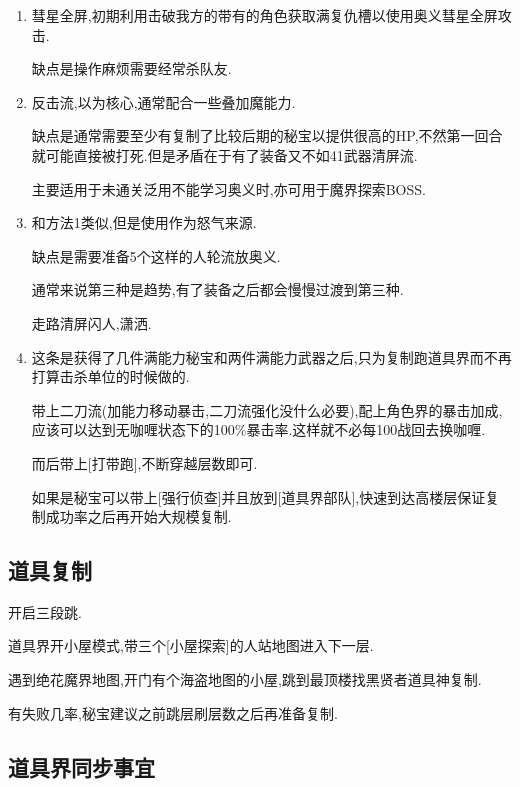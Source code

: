 	\begin{enumerate}

		\item
		彗星全屏,初期利用击破我方的带有{\color{red}{自我牺牲}}的角色获取满复仇槽以使用奥义彗星全屏攻击.
		
		缺点是操作麻烦需要经常杀队友.

		\item
		反击流,以{\color{red}{强制反击+防御必定反击}}为核心,通常配合一些叠加魔能力.

		缺点是通常需要至少有复制了比较后期的秘宝以提供很高的HP,不然第一回合就可能直接被打死.但是矛盾在于有了装备又不如41武器清屏流.

		主要适用于未通关泛用不能学习奥义时,亦可用于魔界探索BOSS.

		\item
		和方法1类似,但是使用{\color{red}{41号武器}}作为怒气来源.

		缺点是需要准备5个这样的人轮流放奥义.

		通常来说第三种是趋势,有了装备之后都会慢慢过渡到第三种.

		走路清屏闪人,潇洒.

		\item
		这条是获得了几件满能力秘宝和两件满能力武器之后,只为复制跑道具界而不再打算击杀单位的时候做的.

		带上二刀流(加能力移动暴击,二刀流强化没什么必要),配上角色界的暴击加成,应该可以达到无咖喱状态下的100\%暴击率.这样就不必每100战回去换咖喱.

		而后带上[打带跑],不断穿越层数即可.

		如果是秘宝可以带上[强行侦查]并且放到[道具界部队],快速到达高楼层保证复制成功率之后再开始大规模复制.

	\end{enumerate}

	\subsection{道具复制}

	开启三段跳.

	道具界开小屋模式,带三个[小屋探索]的人站地图进入下一层.

	遇到绝花魔界地图,开门有个海盗地图的小屋,跳到最顶楼找黑贤者道具神复制.

	有失败几率,秘宝建议之前跳层刷层数之后再准备复制.


	\subsection{道具界同步事宜}

